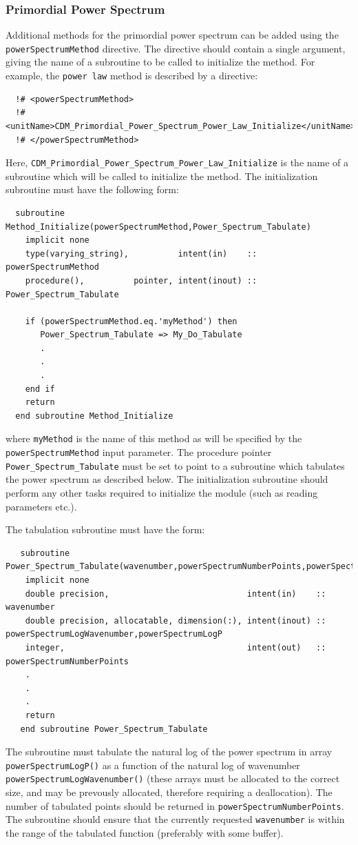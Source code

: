 \subsubsection{Primordial Power Spectrum}

Additional methods for the primordial power spectrum can be added using the {\tt powerSpectrumMethod} directive. The directive should contain a single argument, giving the name of a subroutine to be called to initialize the method. For example, the {\tt power law} method is described by a directive:
\begin{verbatim}
  !# <powerSpectrumMethod>
  !#  <unitName>CDM_Primordial_Power_Spectrum_Power_Law_Initialize</unitName>
  !# </powerSpectrumMethod>
\end{verbatim}
Here, {\tt CDM\_Primordial\_Power\_Spectrum\_Power\_Law\_Initialize} is the name of a subroutine which will be called to initialize the method. The initialization subroutine must have the following form:
\begin{verbatim}
  subroutine Method_Initialize(powerSpectrumMethod,Power_Spectrum_Tabulate)
    implicit none
    type(varying_string),          intent(in)    :: powerSpectrumMethod
    procedure(),          pointer, intent(inout) :: Power_Spectrum_Tabulate
    
    if (powerSpectrumMethod.eq.'myMethod') then
       Power_Spectrum_Tabulate => My_Do_Tabulate
       .
       .
       .
    end if
    return
  end subroutine Method_Initialize
\end{verbatim}
where {\tt myMethod} is the name of this method as will be specified by the {\tt powerSpectrumMethod} input parameter. The procedure pointer {\tt Power\_Spectrum\_Tabulate} must be set to point to a subroutine which tabulates the power spectrum as described below. The initialization subroutine should perform any other tasks required to initialize the module (such as reading parameters etc.).

The tabulation subroutine must have the form:
\begin{verbatim}
   subroutine Power_Spectrum_Tabulate(wavenumber,powerSpectrumNumberPoints,powerSpectrumLogWavenumber,powerSpectrumLogP)
    implicit none
    double precision,                            intent(in)    :: wavenumber
    double precision, allocatable, dimension(:), intent(inout) :: powerSpectrumLogWavenumber,powerSpectrumLogP
    integer,                                     intent(out)   :: powerSpectrumNumberPoints
    .
    .
    .
    return
   end subroutine Power_Spectrum_Tabulate
\end{verbatim}
The subroutine must tabulate the natural log of the power spectrum in array {\tt powerSpectrumLogP()} as a function of the natural log of wavenumber {\tt powerSpectrumLogWavenumber()} (these arrays must be allocated to the correct size, and may be prevously allocated, therefore requiring a deallocation). The number of tabulated points should be returned in {\tt powerSpectrumNumberPoints}. The subroutine should ensure that the currently requested {\tt wavenumber} is within the range of the tabulated function (preferably with some buffer).

